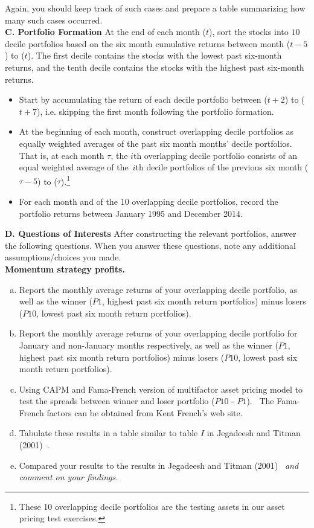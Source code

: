 Again, you should keep track of such cases and prepare a table summarizing how many such cases occurred. \\

\textbf{C. Portfolio Formation}
At the end of each month ($t$), sort the stocks into $10$ decile portfolios based on the six month cumulative returns between month ($t-5$) to ($t$). The first decile contains the stocks with the lowest past six-month returns, and the tenth decile contains the stocks with the highest past six-month returns.
	\begin{itemize}
	\item Start by accumulating the return of each decile portfolio between ($%
t+2 $) to ($t+7$), i.e. skipping the first month following the portfolio
formation.
	\item At the beginning of each month, construct overlapping decile portfolios as equally weighted averages of the past six month months' decile portfolios. That is, at each month $\tau $, the $i$th overlapping decile portfolio consists of an equal weighted average of the\ $i$th decile portfolios of the previous six month ($\tau -5$) to ($\tau $).\footnote{These 10 overlapping decile portfolios are the testing assets in our asset
pricing test exercises.}
	\item For each month and of the 10 overlapping decile portfolios, record the portfolio returns between January 1995 and December 2014. \\
	\end{itemize}

\textbf{D. Questions of Interests}
After constructing the relevant portfolios, answer the following questions. When you answer these questions, note any additional assumptions/choices you made. \\


\textbf{Momentum strategy profits.}
	\begin{enumerate}[a.)]
	\item Report the monthly average returns of your overlapping decile portfolio, as well as the winner ($P1$, highest past six month return portfolios) minus losers ($P10$, lowest past six month return portfolios).
	\item Report the monthly average returns of your overlapping decile portfolio for January and non-January months respectively, as well as the winner ($P1$, highest past six month return portfolios) minus losers ($P10$, lowest past six month return portfolios).
	\item Using CAPM and Fama-French version of multifactor asset pricing model to test the spreads between winner and loser portfolio ($P10$ - $P1$). \ The Fama-French factors can be obtained from Kent French's web site.
	\item Tabulate these results in a table similar to table $I$ in Jegadeesh and Titman (2001)~\cite{JeTi}.
	\item Compared your results to the results in Jegadeesh and Titman (2001)~\cite{JeTi} \emph{and comment on your findings.} \\
	\end{enumerate}

